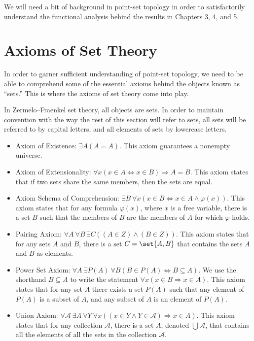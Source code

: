 We will need a bit of background in point-set topology in order to satisfactorily understand the functional analysis behind the results in Chapters 3, 4, and 5.
\section{Axioms of Set Theory}%
In order to garner sufficient understanding of point-set topology, we need to be able to comprehend some of the essential axioms behind the objects known as ``sets.'' This is where the axioms of set theory come into play.
\begin{definition}
  In Zermelo--Fraenkel set theory, all objects are sets. In order to maintain convention with the way the rest of this section will refer to sets, all sets will be referred to by capital letters, and all elements of sets by lowercase letters.
  \begin{itemize}
    \item Axiom of Existence: $\exists A\left(A = A\right)$. This axiom guarantees a nonempty universe.
    \item Axiom of Extensionality: $\forall x\left(x\in A \Leftrightarrow x\in B\right)\Rightarrow A = B$. This axiom states that if two sets share the same members, then the sets are equal.
    \item Axiom Schema of Comprehension: $\exists B\:\forall x\left(x\in B\Leftrightarrow x\in A \wedge\varphi(x)\right)$. This axiom states that for any formula $\varphi(x)$, where $x$ is a free variable, there is a set $B$ such that the members of $B$ are the members of $A$ for which $\varphi$ holds.
    \item Pairing Axiom: $\forall A\:\forall B\:\exists C\left(\left(A\in Z\right)\wedge \left(B\in Z\right)\right)$. This axiom states that for any sets $A$ and $B$, there is a set $C = \set{A,B}$ that contains the sets $A$ and $B$ as elements.
    \item Power Set Axiom: $\forall A\:\exists P(A)\:\forall B\left(B\in P(A) \Leftrightarrow B\subseteq A\right)$. We use the shorthand $B\subseteq A$ to write the statement $\forall x \left(x\in B\Rightarrow x\in A\right)$. This axiom states that for any set $A$ there exists a set $P(A)$ such that any element of $P(A)$ is a subset of $A$, and any subset of $A$ is an element of $P(A)$.
    \item Union Axiom: $\forall \mathcal{A}\:\exists A\:\forall Y\:\forall x\left(\left(x\in Y\wedge Y\in \mathcal{A}\right)\Rightarrow x\in A\right)$. This axiom states that for any collection $\mathcal{A}$, there is a set $A $, denoted $ \bigcup \mathcal{A}$, that contains all the elements of all the sets in the collection $\mathcal{A}$.

\end{itemize}
\end{definition}
